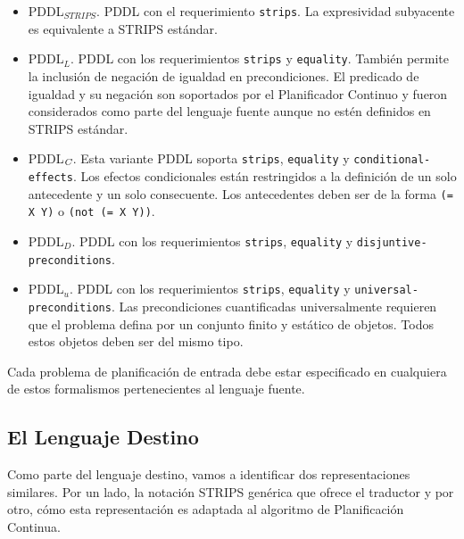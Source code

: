         \begin{itemize}

        \item PDDL$_{STRIPS}$. PDDL con el requerimiento
        \texttt{strips}. La expresividad subyacente es equivalente a STRIPS est\'andar.
        
        \item PDDL$_{L}$. PDDL con los requerimientos \texttt{strips} y \texttt{equality}.
        Tambi\'en permite la inclusi\'on de negaci\'on de igualdad en
        precondiciones. El predicado de igualdad y su negaci\'on son soportados por el
        Planificador Continuo y fueron considerados como
        parte del lenguaje fuente aunque no est\'en definidos en STRIPS est\'andar.

        \item PDDL$_{\emph{C}}$. Esta variante PDDL soporta
        \texttt{strips}, \texttt{equality} y
        \texttt{conditional-effects}. Los efectos condicionales
        est\'an restringidos a la definici\'on de un solo antecedente y
        un solo consecuente. Los antecedentes deben ser de la forma \texttt{(= X
        Y)} o \texttt{(not (= X Y))}.

        \item PDDL$_{D}$. PDDL con los requerimientos \texttt{strips},
          \texttt{equality} y \texttt{disjuntive-preconditions}.

        \item PDDL$_{u}$. PDDL con los requerimientos \texttt{strips},
        \texttt{equality} y \texttt{universal-preconditions}. Las precondiciones
        cuantificadas universalmente requieren que el problema defina por un conjunto finito y
        est\'atico de objetos. Todos estos objetos deben ser del mismo tipo.

        \end{itemize}
        
        Cada problema de planificaci\'on de entrada debe estar
        especificado en cualquiera de estos formalismos pertenecientes
        al lenguaje fuente. 

        \subsection{El Lenguaje Destino} \label{cap5:destino}

        Como parte del lenguaje destino, vamos a identificar dos
        representaciones similares. Por un lado, la notaci\'on STRIPS
        gen\'erica que ofrece el traductor y por otro, c\'omo esta
        representaci\'on es adaptada al algoritmo de Planificaci\'on
        Continua.

